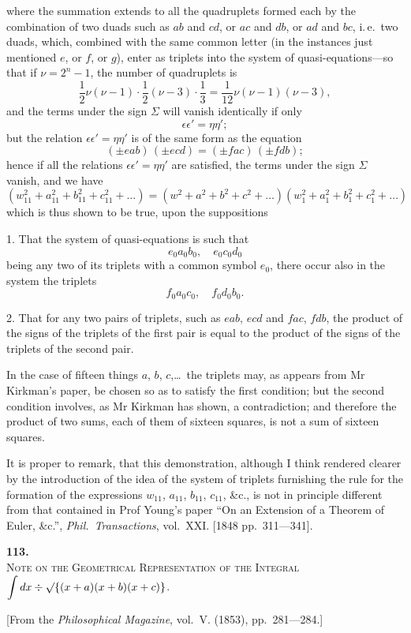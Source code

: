 \documentclass[11pt]{article}
\begin{document}
\newpage
\setcounter{page}{52}

where the summation extends to all the quadruplets formed each by the combination of two duads such as $ab$ and $cd$, or $ac$ and $db$, or $ad$ and $bc$, i.\,e.\ two duads, which, combined with the same common letter (in the instances just mentioned $e$, or $f$, or $g$), enter as triplets into the system of quasi-equations---so that if $\nu = 2^n-1$, the number of quadruplets is
\[
\frac{1}{2}\nu(\nu-1)\cdot\frac{1}{2}(\nu-3)\cdot\frac{1}{3}
= \frac{1}{12}\nu(\nu-1)(\nu-3),
\]
and the terms under the sign $\Sigma$ will vanish identically if only
\[
\epsilon\epsilon' = \eta\eta';
\]
but the relation $\epsilon\epsilon' = \eta\eta'$ is of the same form as the equation
\[
(\pm eab)\,(\pm ecd) = (\pm fac)\,(\pm fdb);
\]
hence if all the relations $\epsilon\epsilon' = \eta\eta'$ are satisfied, the terms under the sign $\Sigma$ vanish, and we have
\[
(w_{11}^2 + a_{11}^2 + b_{11}^2 + c_{11}^2 + \ldots)
= (w^2+a^2+b^2+c^2+\ldots)(w_1^2+a_1^2+b_1^2+c_1^2+\ldots)
\]
which is thus shown to be true, upon the suppositions

1. That the system of quasi-equations is such that
\[
e_0 a_0 b_0, \quad e_0 c_0 d_0
\]
being any two of its triplets with a common symbol $e_0$, there occur also in the system the triplets
\[
f_0 a_0 c_0, \quad f_0 d_0 b_0.
\]

2. That for any two pairs of triplets, such as $eab$, $ecd$ and $fac$, $fdb$, the product of the signs of the triplets of the first pair is equal to the product of the signs of the triplets of the second pair.

In the case of fifteen things $a$, $b$, $c$,\ldots\ the triplets may, as appears from Mr Kirkman's paper, be chosen so as to satisfy the first condition; but the second condition involves, as Mr Kirkman has shown, a contradiction; and therefore the product of two sums, each of them of sixteen squares, is not a sum of sixteen squares.

It is proper to remark, that this demonstration, although I think rendered clearer by the introduction of the idea of the system of triplets furnishing the rule for the formation of the expressions $w_{11}$, $a_{11}$, $b_{11}$, $c_{11}$, \&c., is not in principle different from that contained in Prof Young's paper ``On an Extension of a Theorem of Euler, \&c.'', \textit{Phil.\ Transactions}, vol.~XXI. [1848 pp.~311---341].


\newpage
\setcounter{page}{53}

\begin{center}
{\Large\bfseries 113.}\\[0.5em]
{\large\scshape Note on the Geometrical Representation of the Integral $\displaystyle\int dx \div \surd\{(x+a)(x+b)(x+c)\}$.}
\end{center}
\vspace{0.3em}
\begin{center}
\small [From the \textit{Philosophical Magazine}, vol.~V. (1853), pp.~281---284.]
\end{center}
\vspace{0.5em}
\end{document}

